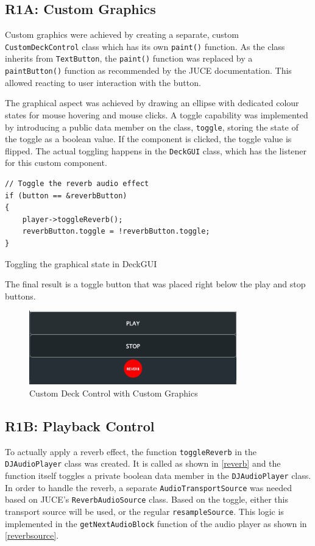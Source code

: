 \subsection{R1A: Custom Graphics}
Custom graphics were achieved by creating a separate, custom \texttt{CustomDeckControl} class which has its own \texttt{paint()} function. As the class inherits from \texttt{TextButton}, the \texttt{paint()} function was replaced by a \texttt{paintButton()} function as recommended by the JUCE documentation. This allowed reacting to user interaction with the button.

The graphical aspect was achieved by drawing an ellipse with dedicated colour states for mouse hovering and mouse clicks. A toggle capability was implemented by introducing a public data member on the class, \texttt{toggle}, storing the state of the toggle as a boolean value. If the component is clicked, the toggle value is flipped. The actual toggling happens in the \texttt{DeckGUI} class, which has the listener for this custom component.

\begin{listing}[H]
	\begin{verbatim}
// Toggle the reverb audio effect
if (button == &reverbButton)
{
	player->toggleReverb();
	reverbButton.toggle = !reverbButton.toggle;
}
	\end{verbatim}
	\caption{Toggling the graphical state in DeckGUI}
	\label{reverb}
\end{listing}

The final result is a toggle button that was placed right below the play and stop buttons.

\begin{figure}[H]
	\centering
	\includegraphics[width=9cm]{reverb.png}
	\caption{Custom Deck Control with Custom Graphics}
\end{figure}

\subsection{R1B: Playback Control}
To actually apply a reverb effect, the function \texttt{toggleReverb} in the \texttt{DJAudioPlayer} class was created. It is called as shown in \autoref{reverb} and the function itself toggles a private boolean data member in the \texttt{DJAudioPlayer} class. In order to handle the reverb, a separate \texttt{AudioTransportSource} was needed based on JUCE's \texttt{ReverbAudioSource} class. Based on the toggle, either this transport source will be used, or the regular \texttt{resampleSource}. This logic is implemented in the \texttt{getNextAudioBlock} function of the audio player as shown in \autoref{reverbsource}.

